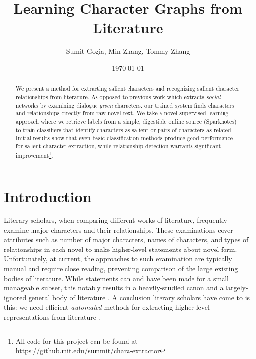 \documentclass[12pt]{article}
\begin{document}
\title{Learning Character Graphs from Literature}
\author{Sumit Gogia, Min Zhang, Tommy Zhang}
\date{\today}

\maketitle

\begin{abstract}

    We present a method for extracting salient characters and recognizing salient character relationships from literature. As opposed to previous work which extracts \emph{social} networks by examining dialogue \emph{given} characters, our trained system finds characters and relationships directly from raw novel text. We take a novel supervised learning approach where we retrieve labels from a simple, digestible online source (Sparknotes) to train classifiers that identify characters as salient or pairs of characters as related. Initial results show that even basic classification methods produce good performance for salient character extraction, while relationship detection warrants significant improvement\footnote{All code for this project can be found at \url{https://github.mit.edu/summit/chara-extractor}}. 

\end{abstract}

\section{Introduction}

Literary scholars, when comparing different works of literature, frequently examine major characters and their relationships. These examinations cover attributes such as number of major characters, names of characters, and types of relationships in each novel to make higher-level statements about novel form. \\

Unfortunately, at current, the approaches to such examination are typically manual and require close reading, preventing comparison of the large existing bodies of literature. While statements can and have been made for a small manageable subset, this notably results in a heavily-studied canon and a largely-ignored general body of literature \cite{moretti2013distant}. A conclusion literary scholars have come to is this: we need efficient \emph{automated} methods for extracting higher-level representations from literature \cite{moretti2005graphs}. \\
\end{document}
